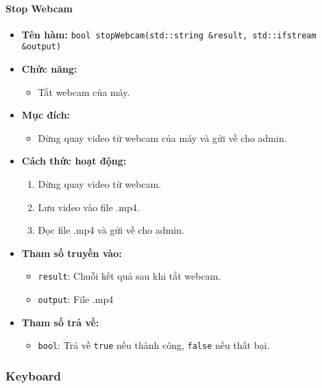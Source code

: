 \paragraph{Stop Webcam}
\begin{itemize}
    \item \textbf{Tên hàm:} \texttt{bool stopWebcam(std::string \&result, std::ifstream \&output)}
    \item \textbf{Chức năng:}
    \begin{itemize}
        \item Tắt webcam của máy.
    \end{itemize}
    \item \textbf{Mục đích:}
    \begin{itemize}
        \item Dừng quay video từ webcam của máy và gửi về cho admin.
    \end{itemize}
    \item \textbf{Cách thức hoạt động:}
    \begin{enumerate}
        \item Dừng quay video từ webcam.
        \item Lưu video vào file .mp4.
        \item Đọc file .mp4 và gửi về cho admin.
    \end{enumerate}
    \item \textbf{Tham số truyền vào:}
    \begin{itemize}
        \item \texttt{result}: Chuỗi kết quả sau khi tắt webcam.
        \item \texttt{output}: File .mp4
    \end{itemize}
    \item \textbf{Tham số trả về:}
    \begin{itemize}
        \item \texttt{bool}: Trả về \texttt{true} nếu thành công, \texttt{false} nếu thất bại.
    \end{itemize}
\end{itemize}

\subsubsection{Keyboard}
\label{subsec:keyboard}


